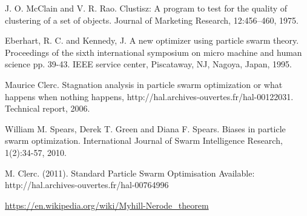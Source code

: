 \documentclass[runningheads, a4paper]{llncs}
\begin{document}
\begin{figure}[h]


\end{figure}





















\begin{thebibliography}{4}

J. O. McClain and V. R. Rao. Clustisz: A program to test for the quality of
clustering of a set of objects. Journal of Marketing Research, 12:456–460,
1975.


Eberhart, R. C. and Kennedy, J. A new optimizer using particle swarm theory. Proceedings of the sixth international symposium on micro machine and human science pp. 39-43. IEEE service center, Piscataway, NJ, Nagoya, Japan, 1995.

Maurice Clerc. Stagnation analysis in particle swarm optimization or what happens when nothing happens, http://hal.archives-ouvertes.fr/hal-00122031. Technical report, 2006.

William M. Spears, Derek T. Green and Diana F. Spears. Biases in particle swarm optimization. International Journal of Swarm Intelligence Research, 1(2):34-57, 2010.


M. Clerc. (2011). Standard Particle Swarm Optimisation Available: http://hal.archives-ouvertes.fr/hal-00764996 


\url{https://en.wikipedia.org/wiki/Myhill-Nerode_theorem}

\end{thebibliography}
\end{document}
